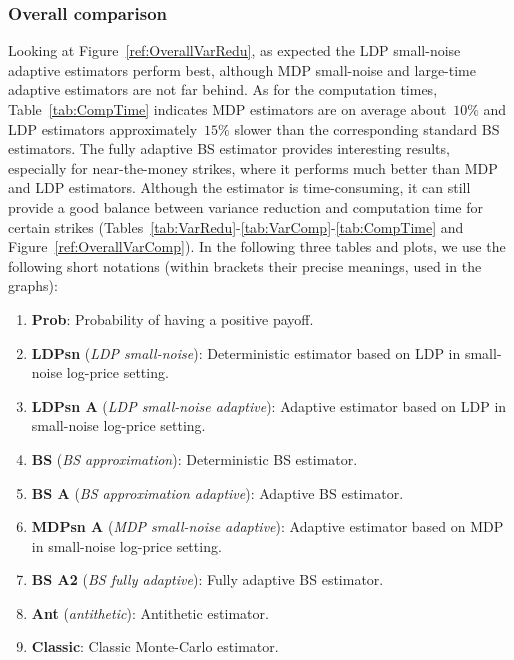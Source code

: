 \subsubsection{Overall comparison}

Looking at Figure~\ref{ref:OverallVarRedu}, as expected the LDP small-noise adaptive estimators perform best, although MDP small-noise and large-time adaptive estimators are not far behind. 
As for the computation times, Table~\ref{tab:CompTime} indicates MDP estimators are on average about~$10\%$  and LDP estimators approximately~$15\%$ slower than the corresponding standard BS estimators. The fully adaptive BS estimator provides interesting results, especially for near-the-money strikes, where it performs much better than MDP and LDP estimators. 
Although the estimator is time-consuming, it can still provide a good balance between variance reduction and computation time for certain strikes (Tables~\ref{tab:VarRedu}-\ref{tab:VarComp}-\ref{tab:CompTime} and Figure~\ref{ref:OverallVarComp}).
In the following three tables and plots, we use the following short notations (within brackets their precise meanings, used in the graphs):

\begin{enumerate}[-]
    \item \textbf{Prob}: Probability of having a positive payoff.
    \item \textbf{LDPsn} (\textit{LDP small-noise}): Deterministic estimator based on LDP in small-noise log-price setting.
    \item \textbf{LDPsn A} (\textit{LDP small-noise adaptive}): Adaptive estimator based on LDP in small-noise log-price setting.
    \item \textbf{BS} (\textit{BS approximation}): Deterministic BS estimator.
    \item \textbf{BS A} (\textit{BS approximation adaptive}): Adaptive BS estimator.
    \item \textbf{MDPsn A} (\textit{MDP small-noise adaptive}): Adaptive estimator based on MDP in small-noise log-price setting.
    \item \textbf{BS A2} (\textit{BS fully adaptive}): Fully adaptive BS estimator.
    \item \textbf{Ant} (\textit{antithetic}): Antithetic estimator.
    \item \textbf{Classic}: Classic Monte-Carlo estimator.
\end{enumerate}

